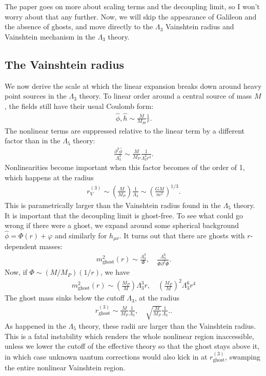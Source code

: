 \documentclass{book}
\theoremstyle{definition}
\newcommand{\p}{\partial}
\newcommand{\f}[2]{\frac{#1}{#2}}
\newcommand{\lp}{\left(}
\newcommand{\rp}{\right)}
\begin{document}
The paper goes on more about scaling terms and the decoupling limit, so I won't worry about that any further. Now, we will skip the appearance of Galileon and the absence of ghosts, and move directly to the $\Lambda_3$ Vainshtein radius and Vainshtein mechanism in the $\Lambda_3$ theory.


\newpage

\subsection{The Vainshtein radius}


We now derive the scale at which the linear expansion breaks down around heavy point sources in the $\Lambda_3$ theory. To linear order around a central source of mass $M$, the fields still have their usual Coulomb form:
\begin{align}
\hat{\phi}, \hat{h} \sim \f{M}{M_{Pl}}\f{1}{r}.
\end{align}
The nonlinear terms are suppressed relative to the linear term by a different factor than in the $\Lambda_5$ theory:
\begin{align}
\f{\p^2 \hat{\phi}}{\Lambda^3_3} \sim \f{M}{M_P}\f{1}{\Lambda_3^3 r^3}.
\end{align}
Nonlinearities become important when this factor becomes of the order of 1, which happens at the radius
\begin{align}
r_V^{(3)} \sim \lp \f{M}{M_P} \rp \f{1}{\Lambda_3} \sim \lp \f{GM}{m^2} \rp^{1/3}.
\end{align}
This is parametrically larger than the Vainshtein radius found in the $\Lambda_5$ theory. \\

It is important that the decoupling limit is ghost-free. To see what could go wrong if there were a ghost, we expand around some spherical background $\hat{\phi} = \Phi(r) + \varphi$ and similarly for $h_{\mu\nu}$. It turns out that there are ghosts with $r$-dependent masses:
\begin{align}
m^2_{\text{ghost}}(r) \sim \f{\Lambda_3^3}{\Phi}, \quad \f{\Lambda_3^6}{\Phi \p^2 \Phi}.
\end{align}
Now, if $\Phi \sim (M/M_P)(1/r)$, we have
\begin{align}
m^2_{\text{ghost}}(r) \sim \lp\f{M_P}{M}\rp \Lambda_3^3 r, \quad \lp \f{M_P}{M} \rp^2 \Lambda_3^6 r^4
\end{align}
The ghost mass sinks below the cutoff $\Lambda_3$, at the radius
\begin{align}
r_\text{ghost}^{(3)} \sim \f{M}{M_P}\f{1}{\Lambda_3}, \quad \sqrt{\f{M}{M_P}}\f{1}{\Lambda_3}..
\end{align}
As happened in the $\Lambda_5$ theory, these radii are larger than the Vainshtein radius. This is a fatal instability which renders the whole nonlinear region inaccessible, unless we lower the cutoff of the effective theory so that the ghost stays above it, in which case unknown uantum corrections would also kick in at $r_\text{ghost}^{(3)}$, swamping the entire nonlinear Vainshtein region.  
\end{document}
